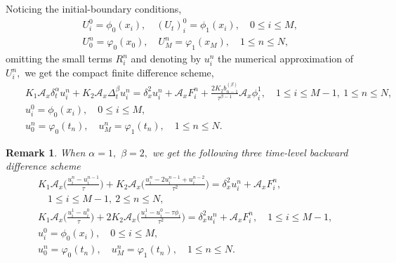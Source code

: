 \documentclass[11pt]{article}
\newtheorem{rem}[thm]{Remark}
\begin{document}
{Noticing the initial-boundary conditions,
\begin{eqnarray}
&&U_i^0=\phi_0(x_i) , \quad  (U_t)_i^0=\phi_1(x_i),\quad  0\leq i\leq M , \label{eq-8}   \\
&& U_0^n=\varphi_0(x_0),\quad U_M^n=\varphi_1(x_M),\quad 1\leq n\leq N ,     \label{eq-9}
\end{eqnarray}
 omitting the small terms $R_i^n $ and
denoting by $u_i^n$ the numerical approximation of $U_i^n,$  we get the compact finite difference scheme,
\begin{eqnarray}
&&K_1 \mathcal{A}_x\delta_t^{\alpha}u_i^n  +K_2 \mathcal{A}_x\Delta_t^{\beta} u_i^n=  \delta_x^2 u_i^n+\mathcal{A}_xF_i^n+   \frac{2K_2b_{n-1}^{(\beta)}}{\tau^{\beta-1}} \mathcal{A}_x \phi_i^1,
\quad
1\leq i\leq M-1,~1\leq n\leq  N,\quad \label{b9}\\
&&u_i^0=\phi_0(x_i) , \quad  0\leq i\leq M , \label{b10}   \\
&&  u_0^n=\varphi_0(t_n),\quad u_M^n=\varphi_1(t_n),\quad 1\leq n\leq N.  \label{b11}
\end{eqnarray}
\begin{rem}
When $\alpha=1,$ $\beta=2,$ we get the following three time-level backward difference scheme
\begin{eqnarray}
&&K_1 \mathcal{A}_x \biggl(\frac{u_i^n-u_i^{n-1}}{\tau}\biggl)  +K_2 \mathcal{A}_x \biggl( \frac{u_i^n-2u_i^{n-1}+u_i^{n-2}}{\tau^2} \biggl)=  \delta_x^2 u_i^n+\mathcal{A}_xF_i^n,
 \nonumber\\
&&
\quad
1\leq i\leq M-1,~2\leq n\leq  N,\quad \label{b99}\\
&&K_1 \mathcal{A}_x \biggl(\frac{u_i^1-u_i^{0}}{\tau} \biggl)  + 2K_2  \mathcal{A}_x \biggl(\frac{u_i^1-u_i^{0}-\tau \phi_i}{\tau^2} \biggl) =  \delta_x^2 u_i^n+\mathcal{A}_xF_i^n,
\quad
1\leq i\leq M-1,\quad \label{b112}\\
&&u_i^0=\phi_0(x_i) , \quad  0\leq i\leq M , \label{b100}   \\
&&  u_0^n=\varphi_0(t_n),\quad u_M^n=\varphi_1(t_n),\quad 1\leq n\leq N.  \label{b111}
\end{eqnarray}
\end{rem}
}


\end{document}
